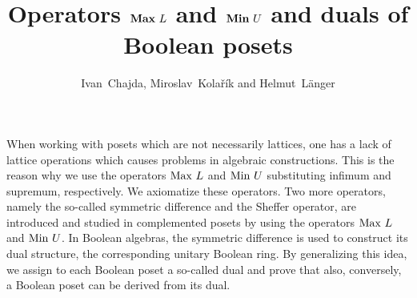 \documentclass[a4paper]{article} %
\date{} %
\begin{document}
\setcounter{page}{1} %

\title{Operators ${\bf Max}\  L$ and ${\bf Min}\  U$ and duals of Boolean posets}

\author{Ivan~Chajda, Miroslav~Kola\v r\'ik and Helmut~L\"anger}

\maketitle

When working with posets which are not necessarily lattices, one has a lack of lattice operations which causes problems in algebraic constructions. This is the reason why we use the operators ${\rm Max}\  L$ and ${\rm Min}\  U$ substituting infimum and supremum, respectively. We axiomatize these operators. Two more operators, namely the so-called symmetric difference and the Sheffer operator, are introduced and studied in complemented posets by using the operators ${\rm Max}\  L$ and ${\rm Min}\  U$. In Boolean algebras, the symmetric difference is used to construct its dual structure, the corresponding unitary Boolean ring. By generalizing this idea, we assign to each Boolean poset a so-called dual and prove that also, conversely, a Boolean poset can be derived from its dual.
\end{document}
